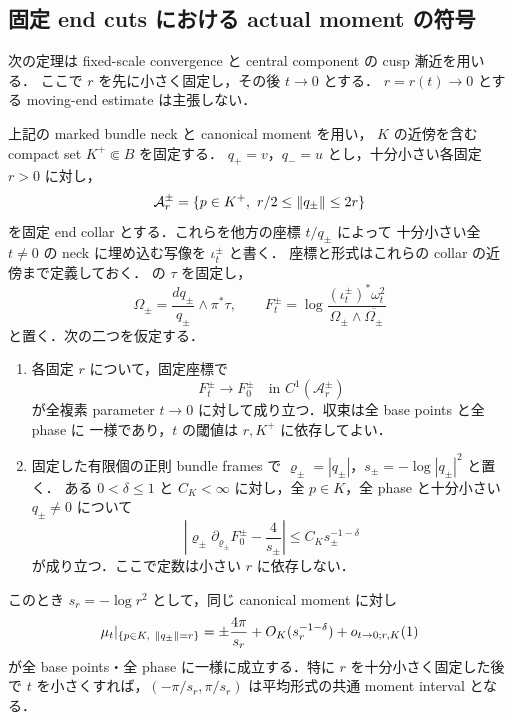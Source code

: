 \subsection{固定 end cuts における actual moment の符号}

次の定理は fixed-scale convergence と central component の cusp 漸近を用いる．
ここで $r$ を先に小さく固定し，その後 $t\to0$ とする．
$r=r(t)\to0$ とする moving-end estimate は主張しない．

\begin{proposition}
\label{pair:prop:fixed-end-transfer}
上記の marked bundle neck と canonical moment を用い，
$K$ の近傍を含む compact set $K^+\Subset B$ を固定する．
$q_+=v$，$q_-=u$ とし，十分小さい各固定 $r>0$ に対し，
\[
 \mathcal A_r^\pm
 =\{p\in K^+,\ r/2\le\left\lVert q_\pm\right\rVert\le2r\}
\]
を固定 end collar とする．これらを他方の座標 $t/q_\pm$ によって
十分小さい全 $t\ne0$ の neck に埋め込む写像を $\iota_t^\pm$ と書く．
座標と形式はこれらの collar の近傍まで定義しておく．
 の $\tau$ を固定し，
\[
 \Omega_\pm=\frac{dq_\pm}{q_\pm}\wedge\pi^*\tau,
 \qquad
 F_t^\pm=\log\frac{(\iota_t^\pm)^*\omega_t^2}
                         {\Omega_\pm\wedge\overline{\Omega_\pm}}
\]
と置く．次の二つを仮定する．
\begin{enumerate}
\item 各固定 $r$ について，固定座標で
\begin{equation}\label{pair:eq:fixed-end-density-input}
 F_t^\pm\longrightarrow F_0^\pm
 \quad\text{in }C^1(\mathcal A_r^\pm)
\end{equation}
が全複素 parameter $t\to0$ に対して成り立つ．収束は全 base points と全 phase に
一様であり，$t$ の閾値は $r,K^+$ に依存してよい．
\item 固定した有限個の正則 bundle frames で
$\varrho_\pm=|q_\pm|$，$s_\pm=-\log|q_\pm|^2$ と置く．
ある $0<\delta\le1$ と $C_K<\infty$ に対し，全 $p\in K$，全 phase と十分小さい
$q_\pm\ne0$ について
\begin{equation}\label{pair:eq:fixed-end-radial-input}
 \left|\varrho_\pm\partial_{\varrho_\pm}F_0^\pm
                         -\frac4{s_\pm}\right|
 \le C_Ks_\pm^{-1-\delta}
\end{equation}
が成り立つ．ここで定数は小さい $r$ に依存しない．
\end{enumerate}
このとき $s_r=-\log r^2$ として，同じ canonical moment に対し
\begin{equation}\label{pair:eq:fixed-end-transfer}
 \mu_t|_{\{p\in K,\ \left\lVert q_\pm\right\rVert=r\}}
 =\pm\frac{4\pi}{s_r}
   +O_K(s_r^{-1-\delta})+o_{t\to0;r,K}(1)
\end{equation}
が全 base points・全 phase に一様に成立する．特に $r$ を十分小さく固定した後で
$t$ を小さくすれば，$(-\pi/s_r,\pi/s_r)$ は平均形式の共通 moment interval となる．
\end{proposition}

